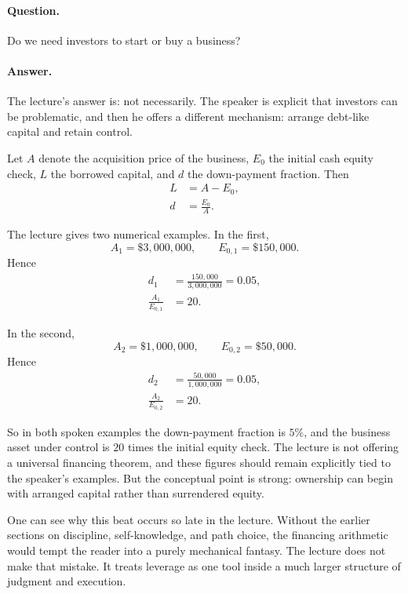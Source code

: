 \paragraph{Question.} Do we need investors to start or buy a business?

\paragraph{Answer.} The lecture's answer is: not necessarily. The speaker is explicit that investors can be problematic, and then he offers a different mechanism: arrange debt-like capital and retain control.

Let \(A\) denote the acquisition price of the business, \(E_0\) the initial cash equity check, \(L\) the borrowed capital, and \(d\) the down-payment fraction. Then
\begin{align}
L &= A - E_0, \\
d &= \frac{E_0}{A}.
\end{align}

The lecture gives two numerical examples. In the first,
\[
A_1 = \$3{,}000{,}000,
\qquad
E_{0,1} = \$150{,}000.
\]
Hence
\begin{align}
d_1 &= \frac{150{,}000}{3{,}000{,}000} = 0.05, \\
\frac{A_1}{E_{0,1}} &= 20.
\end{align}

In the second,
\[
A_2 = \$1{,}000{,}000,
\qquad
E_{0,2} = \$50{,}000.
\]
Hence
\begin{align}
d_2 &= \frac{50{,}000}{1{,}000{,}000} = 0.05, \\
\frac{A_2}{E_{0,2}} &= 20.
\end{align}

So in both spoken examples the down-payment fraction is \(5\%\), and the business asset under control is \(20\) times the initial equity check. The lecture is not offering a universal financing theorem, and these figures should remain explicitly tied to the speaker's examples. But the conceptual point is strong: ownership can begin with arranged capital rather than surrendered equity.

One can see why this beat occurs so late in the lecture. Without the earlier sections on discipline, self-knowledge, and path choice, the financing arithmetic would tempt the reader into a purely mechanical fantasy. The lecture does not make that mistake. It treats leverage as one tool inside a much larger structure of judgment and execution.

